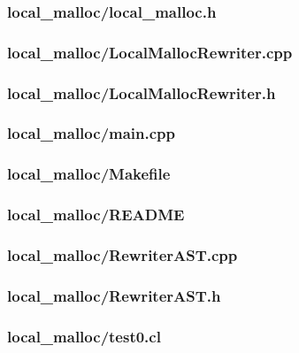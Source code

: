 \documentclass{article}
\begin{document}
\subsubsection*{local\_malloc/local\_malloc.h}


\subsubsection*{local\_malloc/LocalMallocRewriter.cpp}


\subsubsection*{local\_malloc/LocalMallocRewriter.h}


\subsubsection*{local\_malloc/main.cpp}


\subsubsection*{local\_malloc/Makefile}


\subsubsection*{local\_malloc/README}


\subsubsection*{local\_malloc/RewriterAST.cpp}


\subsubsection*{local\_malloc/RewriterAST.h}


\subsubsection*{local\_malloc/test0.cl}

\end{document}
